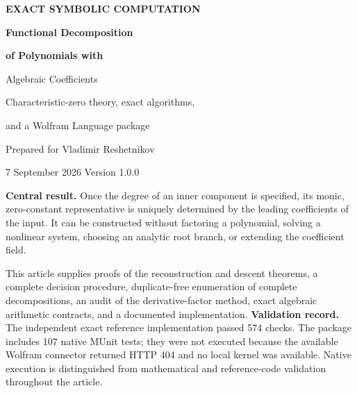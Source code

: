\documentclass[11pt,letterpaper]{article}
\theoremstyle{definition}
\theoremstyle{remark}
\begin{document}
\begin{titlepage}
\thispagestyle{empty}
\vspace*{0.6in}
{\small\sffamily\bfseries\color{ink} EXACT SYMBOLIC COMPUTATION\par}
\vspace{0.3in}
{\Huge\bfseries\color{ink} Functional Decomposition\par}
\vspace{0.08in}
{\huge\bfseries\color{ink} of Polynomials with\par Algebraic Coefficients\par}
\vspace{0.3in}
{\Large Characteristic-zero theory, exact algorithms,\par and a Wolfram Language package\par}
\vspace{0.45in}
{\large Prepared for Vladimir Reshetnikov\par}
\vspace{0.08in}
{7 September 2026 \quad\textbar\quad Version 1.0.0\par}
\vspace{0.5in}
\begin{tcolorbox}
\textbf{Central result.} Once the degree of an inner component is specified,
its monic, zero-constant representative is uniquely determined by the leading
coefficients of the input. It can be constructed without factoring a
polynomial, solving a nonlinear system, choosing an analytic root branch,
or extending the coefficient field.
\end{tcolorbox}
\vspace{0.25in}
\noindent This article supplies proofs of the reconstruction and descent
theorems, a complete decision procedure, duplicate-free enumeration of complete
decompositions, an audit of the derivative-factor method, exact algebraic
arithmetic contracts, and a documented implementation.
\vfill
\noindent\small\textbf{Validation record.} The independent exact reference
implementation passed 574 checks. The package includes 107 native MUnit tests;
they were not executed because the available Wolfram connector returned
HTTP 404 and no local kernel was available. Native execution is distinguished
from mathematical and reference-code validation throughout the article.
\end{titlepage}
\end{document}
